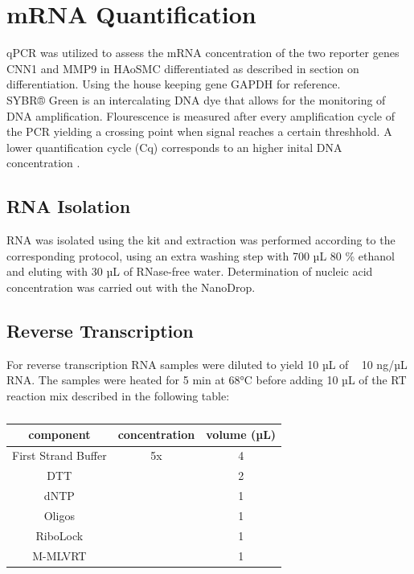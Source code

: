 \section{mRNA Quantification}
\label{sec:qpcr}
qPCR was utilized to assess the mRNA concentration of the two reporter genes CNN1 and MMP9 in HAoSMC differentiated as described in section on differentiation. Using the house keeping gene GAPDH for reference.\\
SYBR® Green is an intercalating DNA dye that allows for the monitoring of DNA amplification. Flourescence is measured after every amplification cycle of the PCR yielding a crossing point when signal reaches a certain threshhold. A lower quantification cycle (Cq) corresponds to an higher inital DNA concentration \cite{huggettStandardisationReportingNucleic2011}.

    \subsection{RNA Isolation}
    RNA was isolated using the kit and extraction was performed according to the corresponding protocol, using an extra washing step with 700 µL 80 \% ethanol and eluting with 30 µL of RNase-free water. Determination of nucleic acid concentration was carried out with the NanoDrop.

    \subsection{Reverse Transcription}
    For reverse transcription RNA samples were diluted to yield 10 µL of ~ 10 ng/µL RNA. The samples were heated for 5 min at 68°C before adding 10 µL of the RT reaction mix described in the following table:

    \begin{table}[h]
    \capstart
	\centering
	\begin{minipage}{\captionwidth}
	   	\caption[RT mastermix]{}
	   	\label{tab:RT Mastr Mix}
	\end{minipage}
    \begin{tabular}{|c|c|c|}
        \hline
        component           & concentration & volume (µL) \\ \hline
        First Strand Buffer & 5x            & 4           \\
        DTT                 &               & 2           \\
        dNTP                &               & 1           \\
        Oligos              &               & 1           \\
        RiboLock            &               & 1           \\
        M-MLVRT             &               & 1           \\ \hline
    \end{tabular}
    \end{table}

